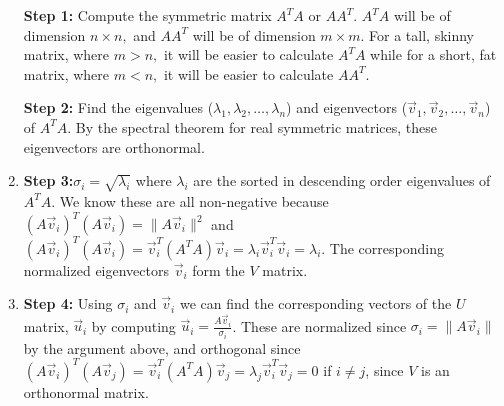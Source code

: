 \begin{enumerate}
  \qitem \textbf{Step 1:} Compute the symmetric matrix $A^{T} A$ or $A A^{T}.$ \vskip 1pt
  $A^{T}A$ will be of dimension $n \times n,$ and $AA^{T}$ will be of dimension $m \times m.$ \vskip 1pt
  For a tall, skinny matrix, where $m > n,$ it will be easier to calculate $A^{T}A$ while for a short, fat matrix, where $m < n,$ it will be easier to calculate $AA^{T}.$ 

  \qitem \textbf{Step 2:} Find the eigenvalues ($\lambda_1, \lambda_2, \ldots, \lambda_{n}$) and eigenvectors ($\vec{v}_1, \vec{v}_2, \ldots, \vec{v}_{n}$) of $A^TA$. By the spectral theorem for real symmetric matrices, these eigenvectors are orthonormal.

  \item \textbf{Step 3:}$\sigma_i = \sqrt{\lambda_i}$ where $\lambda_i$ are the sorted in descending order eigenvalues of $A^TA$. We know these are all non-negative because $(A\vec{v}_i)^T(A\vec{v}_i) = \|A \vec{v}_i\|^2$ and $(A\vec{v}_i)^T(A\vec{v}_i) =\vec{v}_i^T(A^T A)\vec{v}_i = \lambda_i \vec{v}_i^T\vec{v}_i = \lambda_i$. The corresponding normalized eigenvectors $\vec{v}_i$ form the $V$ matrix. 

  \item \textbf{Step 4:} Using $\sigma_i$ and $\vec{v}_i$ we can find the corresponding vectors of the $U$ matrix, $\vec{u}_i$ by computing $\vec{u}_i = \frac{A\vec{v}_i}{\sigma_i}$. These are normalized since $\sigma_i = \|A \vec{v}_i\|$ by the argument above, and orthogonal since $(A\vec{v}_i)^T(A\vec{v}_j) = \vec{v}_i^T(A^T A)\vec{v}_j = \lambda_j \vec{v}_i^T\vec{v}_j = 0$ if $i \neq j$, since $V$ is an orthonormal matrix. 

\end{enumerate}

  


